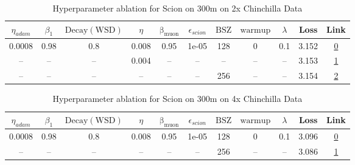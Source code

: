 \begin{table}[H]
\centering
\caption{Hyperparameter ablation for Scion on 300m on 2x Chinchilla Data}
\label{tab:ablation_scion_300m_2}
\begin{tabular}{ccccccccccc}
\toprule
$\eta_{adam}$ & $\beta_1$ & $\mathrm{Decay (WSD)}$ & $\eta$ & $\mathrm{\beta_{muon}}$ & $\epsilon_{scion}$ & $\mathrm{BSZ}$ & $\mathrm{warmup}$ & $\lambda$ & Loss & Link \\
\midrule
0.0008 & 0.98 & 0.8 & 0.008 & 0.95 & 1e-05 & 128 & 0 & 0.1 & 3.152 & \href{https://wandb.ai/stanford-mercury/optimizer-scaling/runs/sweep-300m-12B-scion4b55fclr0.008-wd0.1-minlr0-warmup0-b10.98-gn-2aec1d}{0} \\
\midrule
-- & -- & -- & 0.004 & -- & -- & -- & -- & -- & 3.153 & \href{https://wandb.ai/stanford-mercury/optimizer-scaling/runs/sweep-300m-12B-scionac146alr0.004-wd0.1-minlr0-warmup0-b10.98-gn-3fb1ff}{1} \\
-- & -- & -- & -- & -- & -- & 256 & -- & -- & 3.154 & \href{https://wandb.ai/stanford-mercury/optimizer-scaling/runs/sweep-300m-12B-scion26da5flr0.008-wd0.1-minlr0-warmup0-b10.98-gn-81fece}{2} \\
\bottomrule
\end{tabular}
\end{table}

\begin{table}[H]
\centering
\caption{Hyperparameter ablation for Scion on 300m on 4x Chinchilla Data}
\label{tab:ablation_scion_300m_4}
\begin{tabular}{ccccccccccc}
\toprule
$\eta_{adam}$ & $\beta_1$ & $\mathrm{Decay (WSD)}$ & $\eta$ & $\mathrm{\beta_{muon}}$ & $\epsilon_{scion}$ & $\mathrm{BSZ}$ & $\mathrm{warmup}$ & $\lambda$ & Loss & Link \\
\midrule
0.0008 & 0.98 & 0.8 & 0.008 & 0.95 & 1e-05 & 128 & 0 & 0.1 & 3.096 & \href{https://wandb.ai/stanford-mercury/optimizer-scaling/runs/sweep-300m-24B-scion6ef04dlr0.008-wd0.1-minlr0-warmup0-b10.98-gn-4063d9}{0} \\
\midrule
-- & -- & -- & -- & -- & -- & 256 & -- & -- & 3.086 & \href{https://wandb.ai/stanford-mercury/optimizer-scaling/runs/sweep-300m-24B-scion4b55fclr0.008-wd0.1-minlr0-warmup0-b10.98-gn-4cbf73}{1} \\
\bottomrule
\end{tabular}
\end{table}

